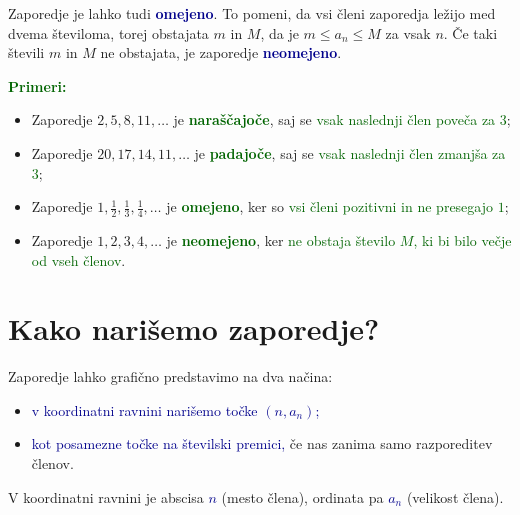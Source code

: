 \documentclass[12pt,a4paper]{article}
\begin{document}
\medskip

Zaporedje je lahko tudi \textcolor{darkblue}{\textbf{omejeno}}. To pomeni, da vsi členi zaporedja ležijo med dvema številoma, torej obstajata $m$ in $M$, da je $m \le a_n \le M$ za vsak $n$. Če taki števili $m$ in $M$ ne obstajata, je zaporedje \textcolor{darkblue}{\textbf{neomejeno}}.

\medskip

\textcolor{darkgreen}{\textbf{Primeri:}}
\begin{itemize}
    \item Zaporedje $2, 5, 8, 11, \ldots$ je \textcolor{darkgreen}{\textbf{naraščajoče}}, saj se \textcolor{darkgreen}{vsak naslednji člen poveča za $3$};
    \item Zaporedje $20, 17, 14, 11, \ldots$ je \textcolor{darkgreen}{\textbf{padajoče}}, saj se \textcolor{darkgreen}{vsak naslednji člen zmanjša za $3$};
    \item Zaporedje $1, \frac12, \frac13, \frac14, \ldots$ je \textcolor{darkgreen}{\textbf{omejeno}}, ker so \textcolor{darkgreen}{vsi členi pozitivni in ne presegajo $1$};
    \item Zaporedje $1, 2, 3, 4, \ldots$ je \textcolor{darkgreen}{\textbf{neomejeno}}, ker \textcolor{darkgreen}{ne obstaja število $M$, ki bi bilo večje od vseh členov}.
\end{itemize}

\section{Kako narišemo zaporedje?}

Zaporedje lahko grafično predstavimo na dva načina:
\begin{itemize}
    \item \textcolor{darkblue}{v koordinatni ravnini narišemo točke $(n, a_n)$;}
    \item \textcolor{darkblue}{kot posamezne točke na številski premici,} če nas zanima samo razporeditev členov.
\end{itemize}

\noindent V koordinatni ravnini je abscisa \textcolor{darkblue}{$n$} (mesto člena), ordinata pa \textcolor{darkblue}{$a_n$} (velikost člena). 

\noindent{}
\medskip
\end{document}
